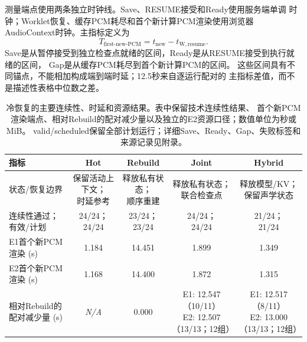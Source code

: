 \documentclass{article}
\begin{document}
测量端点使用两条独立时钟线。Save、RESUME接受和Ready使用服务端单调
时钟；Worklet恢复、缓存PCM耗尽和首个新计算PCM渲染使用浏览器
AudioContext时钟。主指标定义为
\begin{equation}
 T_{\mathrm{first\text{-}new\text{-}PCM}}
 = t_{\mathrm{new}}
   - t_{\mathrm{W,resume}} .
 \label{eq:first_new_pcm}
\end{equation}
Save是从暂停接受到独立检查点就绪的区间，Ready是从RESUME接受到执行就绪的区间，
Gap是从缓存PCM耗尽到首个新计算PCM的区间。
这些区间具有不同锚点，不能相加构成端到端时延；12.5秒来自逐运行配对的
主指标差值，而不是描述性表格中位数之差。

\begin{table}[H]
\centering
\caption{冷恢复的主要连续性、时延和资源结果。表中保留技术连续性结果、
首个新PCM渲染端点、相对Rebuild的配对减少量以及独立的E2资源口径；数值单位为秒或MiB。
valid/scheduled保留全部计划运行；详细Save、Ready、Gap、失败标签和来源记录见附录。}
\label{tab:cold_main}
\scriptsize
\setlength{\tabcolsep}{2.8pt}
\begin{tabular*}{\columnwidth}{@{\extracolsep{\fill}}lcccc@{}}
\toprule
指标 & Hot & Rebuild & Joint & Hybrid \\
\midrule
状态/恢复边界
& \shortstack[l]{保留活动上下文；\\时延参考}
& \shortstack[l]{释放私有状态；\\顺序重建}
& \shortstack[l]{释放私有状态；\\联合检查点}
& \shortstack[l]{释放模型/KV；\\保留声学状态} \\

连续性通过；有效/计划
& \shortstack[l]{24/24；\\24/24}
& \shortstack[l]{23/24；\\23/24}
& \shortstack[l]{24/24；\\24/24}
& \shortstack[l]{21/24；\\21/24} \\

E1首个新PCM渲染 (s)
& 1.184
& 14.451
& 1.899
& 1.349 \\

E2首个新PCM渲染 (s)
& 1.168
& 14.400
& 1.872
& 1.315 \\

相对Rebuild的配对减少量 (s)
& \textit{N/A}
& 0.000
& \shortstack[l]{E1: 12.547（10/11）\\E2: 12.507（13/13；12组）}
& \shortstack[l]{E1: 12.517（8/11）\\E2: 13.000（13/13；12组）} \\


\end{tabular*}
\end{table}
\end{document}
